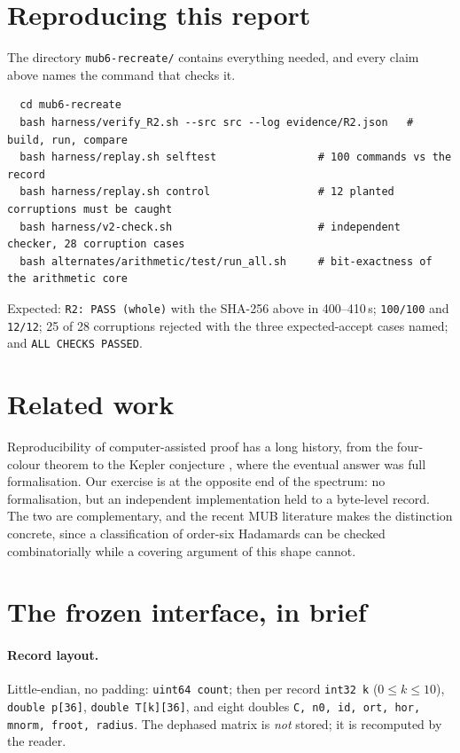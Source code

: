 \documentclass[11pt,a4paper]{article}
\newcommand{\code}[1]{\texttt{\small #1}}
\begin{document}
\section{Reproducing this report}\label{sec:reproduce}

The directory \code{mub6-recreate/} contains everything needed, and every claim above names the command
that checks it.

\begin{verbatim}
  cd mub6-recreate
  bash harness/verify_R2.sh --src src --log evidence/R2.json   # build, run, compare
  bash harness/replay.sh selftest                # 100 commands vs the record
  bash harness/replay.sh control                 # 12 planted corruptions must be caught
  bash harness/v2-check.sh                       # independent checker, 28 corruption cases
  bash alternates/arithmetic/test/run_all.sh     # bit-exactness of the arithmetic core
\end{verbatim}

Expected: \code{R2: PASS (whole)} with the SHA-256 above in 400--410\,s; \code{100/100} and
\code{12/12}; 25 of 28 corruptions rejected with the three expected-accept cases named; and
\code{ALL CHECKS PASSED}.

\section{Related work}

Reproducibility of computer-assisted proof has a long history, from the four-colour theorem
\citep{Gonthier2008} to the Kepler conjecture \citep{Hales2005,Hales2017}, where the eventual answer
was full formalisation. Our exercise is at the opposite end of the spectrum: no formalisation, but an
independent implementation held to a byte-level record. The two are complementary, and the recent MUB
literature \citep{McNultyWeigert2026Review,CardenesWuttigTindall2026Classification,MatolcsiEtAl2026}
makes the distinction concrete, since a classification of order-six Hadamards can be checked
combinatorially while a covering argument of this shape cannot.

\appendix
\section{The frozen interface, in brief}\label{app:interface}

\paragraph{Record layout.} Little-endian, no padding: \code{uint64 count}; then per record
\code{int32 k} ($0\le k\le10$), \code{double p[36]}, \code{double T[k][36]}, and eight doubles
\code{C, n0, id, ort, hor, mnorm, froot, radius}. The dephased matrix is \emph{not} stored; it is
recomputed by the reader.
\end{document}
